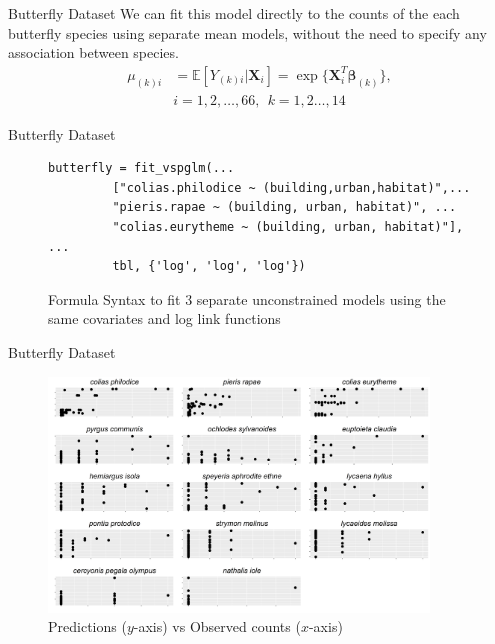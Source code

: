 \documentclass[9pt,notes=hide]{beamer}
\newcommand{\vect}[1]{\boldsymbol #1}
\newcommand{\Em}{\mathbb E}
\newcommand{\vbe}{\vect{\beta}}
\newcommand{\X}{\vect{X}}
\begin{document}
\begin{frame}{Butterfly Dataset}
	We can fit this model directly to the counts of the  each  butterfly species using  separate mean models, without the need to specify any association  between species.
	\pause
	\begin{align*}
		\mu_{(k)i} & = \Em[Y_{(k)i}|\X_i] = \exp\{\X_i^T\vbe_{(k)}\}, \\
		           & i = 1, 2, \dots, 66,   \  \ k= 1,2   \dots, 14
	\end{align*}

\end{frame}

\begin{frame}[fragile]{Butterfly Dataset}
	\begin{figure}
		\centering
		\begin{verbatim}
butterfly = fit_vspglm(...
         ["colias.philodice ~ (building,urban,habitat)",...
         "pieris.rapae ~ (building, urban, habitat)", ...
         "colias.eurytheme ~ (building, urban, habitat)"], ...
         tbl, {'log', 'log', 'log'})
\end{verbatim}
		\caption{Formula Syntax to fit $3$ separate unconstrained models using the same covariates and log link functions}
	\end{figure}
\end{frame}

\begin{frame}{Butterfly Dataset}
	\begin{figure}
		\centering
		\includegraphics[width = 0.9\textwidth]{figures/butterfly_14d_poisson.png}
		\caption{Predictions ($y$-axis) vs Observed counts ($x$-axis) }
		\label{fig:butterfly_14d}
	\end{figure}
\end{frame}
\end{document}
